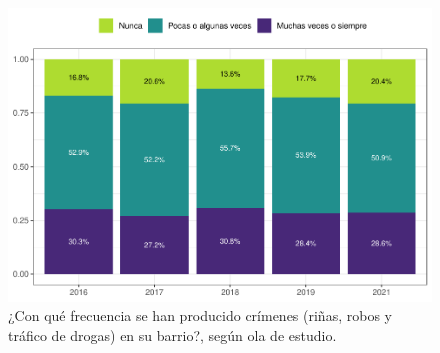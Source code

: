 \documentclass[
  12pt,
]{book}
\begin{document}
\begin{figure}

{\centering \includegraphics{reporte-elsoc_files/figure-latex/crim-olas-1} 

}

\caption{¿Con qué frecuencia se han producido crímenes (riñas, robos y tráfico de drogas) en su barrio?, según ola de estudio.}\label{fig:crim-olas}
\end{figure}
\end{document}
